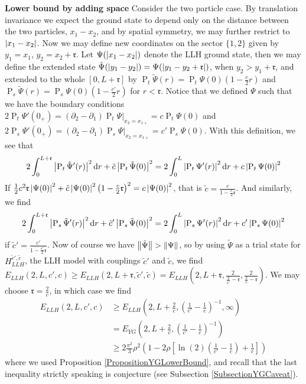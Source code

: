 \textbf{Lower bound by adding space}
Consider the two particle case. By translation invariance we expect the ground state to depend only on the distance between the two particles, $ x_1-x_2 $, and by spatial symmetry, we may further restrict to $ \left\lvert x_1-x_2 \right\rvert $. Now we may define new coordinates on the sector $ \{1,2\} $ given by $ y_1=x_1 $, $ y_2=x_2+\mathfrak{r} $. Let $ \Psi(\left\lvert x_1-x_2 \right\rvert) $ denote the LLH ground state, then we may define the extended state $ \tilde{\Psi}(\left\lvert y_1-y_2 \right\rvert)=\Psi(\left\lvert y_1-y_2+\mathfrak{r} \right\rvert) $, when $ y_2>y_1+\mathfrak{r} $, and extended to the whole $ [0,L+\mathfrak{r}] $ by $ \operatorname{P}_t\tilde{\Psi}(r)=\operatorname{P}_t\Psi(0)\left(1-\frac{c}{2}r\right) $ and $ \operatorname{P}_s\tilde{\Psi}(r)=\operatorname{P}_s\Psi(0)\left(1-\frac{c'}{2}r\right) $ for $ r<\mathfrak{r} $. Notice that we defined $ \Psi $ such that we have the boundary conditions $ 2\operatorname{P}_t\Psi'(0_+)=(\partial_2-\partial_1)\operatorname{P}_t\Psi\vert_{x_2=x_{1+}}=c\operatorname{P}_t\Psi(0) $ and $ 2\operatorname{P}_s\Psi'(0_+)=(\partial_2-\partial_1)\operatorname{P}_s\Psi\vert_{x_2=x_{1+}}=c'\operatorname{P}_s\Psi(0) $. With this definition, we see that \begin{equation}
2\int_{0}^{L+\mathfrak{r}}\left\lvert \operatorname{P}_{t}\tilde{\Psi}'(r) \right\rvert^2\mathop{}\!\mathrm{d} r+\tilde{c}\left\lvert \operatorname{P}_{t}\tilde{\Psi}(0) \right\rvert^2=2\int_{0}^{L}\left\lvert \operatorname{P}_{t}\Psi'(r) \right\rvert^2\mathop{}\!\mathrm{d} r+c\left\lvert \operatorname{P}_{t}\Psi(0) \right\rvert^2
\end{equation} 
If $  \frac{1}{2}c^2\mathfrak{r}\left\lvert \Psi(0) \right\rvert^2+\tilde{c}\left\lvert \Psi(0) \right\rvert^2\left(1-\frac{c}{2}\mathfrak{r}\right)^2=c\left\lvert \Psi(0) \right\rvert^2 $, that is $ \tilde{c}=\frac{c}{1-\frac{c}{2}\mathfrak{r}} $. And similarly, we find \begin{equation}
2\int_{0}^{L+\mathfrak{r}}\left\lvert \operatorname{P}_{s}\tilde{\Psi}'(r) \right\rvert^2\mathop{}\!\mathrm{d} r+\tilde{c}'\left\lvert \operatorname{P}_{s}\tilde{\Psi}(0) \right\rvert^2=2\int_{0}^{L}\left\lvert \operatorname{P}_{s}\Psi'(r) \right\rvert^2\mathop{}\!\mathrm{d} r+c'\left\lvert \operatorname{P}_{s}\Psi(0) \right\rvert^2
\end{equation}
if $ \tilde{c}'=\frac{c'}{1-\frac{c'}{2}\mathfrak{r}} $.
 Now of course we have $ \left\lVert \tilde{\Psi} \right\rVert>\left\lVert \Psi \right\rVert $, so by using $ \tilde{\Psi} $ as a trial state for $ H^{\tilde{c}',\tilde{c}}_{LLH} $, \ie the LLH model with couplings $ \tilde{c}' $ and $\tilde{c}$, we find $ E_{LLH}(2,L,c',c)\geq E_{LLH}(2,L+\mathfrak{r},\tilde{c}',\tilde{c})=E_{LLH}\left(2,L+\mathfrak{r},\frac{2}{\frac{2}{c'}-\mathfrak{r}},\frac{2}{\frac{2}{c}-\mathfrak{r}}\right) $. We may choose $ \mathfrak{r}=\frac{2}{c} $, in which case we find \begin{equation}
 \begin{aligned}
 E_{LLH}(2,L,c',c)&\geq E_{LLH}\left(2,L+\frac{2}{c},\left(\frac{1}{c'}-\frac{1}{c}\right)^{-1},\infty\right)\\&=E_{YG}\left(2,L+\frac{2}{c},\left(\frac{1}{c'}-\frac{1}{c}\right)^{-1}\right)\\&\geq2\frac{\pi^2}{3}\rho^2\left(1-2\rho \left[\ln(2)\left(\frac{1}{c'}-\frac{1}{c}\right)+\frac{1}{c}\right]\right)
 \end{aligned}
 \end{equation}
 where we used Proposition \ref{PropositionYGLowerBound}, and recall that the last inequality strictly speaking is conjecture (see Subsection \ref{SubsectionYGCaveat}).
